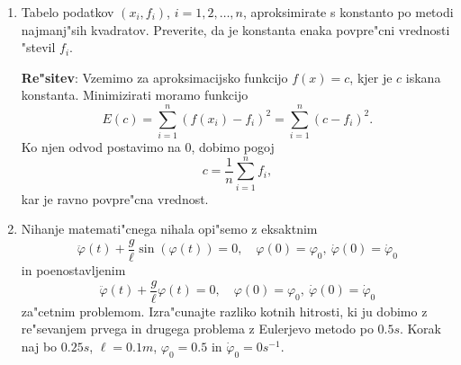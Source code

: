 \begin{enumerate}
    
    {\bf Re"sitev}: Konstanti $\alpha_1$ in $\alpha_2$ izra"cunamo tako, da
    za $f$ zaporedoma izberemo $1$ in $x$ ter zahtevamo, da je formula to"cna.
    Dobimo sistem
    \begin{align*}
    	\alpha_1+\alpha_2&=\arcsin{x}\vert_{-1}^1=\pi,\\
    	\alpha_1\frac{\sqrt{2}}{2}-\alpha_2\frac{\sqrt{2}}{2}&=0,
    \end{align*}
    katerega re"sitev je $\alpha_1=\alpha_2=\pi/2$.\\
    Numeri"cni pribli"zek za integral je torej
    $$\int_{-1}^{1}\frac{e^{x}}{\sqrt{1-x^2}}\,dx\approx
    \frac{\pi}{2}\left(e^{\frac{\sqrt{2}}{2}}+e^{-\frac{\sqrt{2}}{2}}\right)=
    3.9603.
    $$
    Iz Gauss--Chebysheve formule dobimo oceno za absolutno napako
    \begin{align*}
    	&\left|\int_{-1}^{1}\frac{e^{x}}{\sqrt{1-x^2}}\,dx-
        \sum_{k=1}^2 \alpha_k\,e^{\cos\left(\frac{2k-1}{4}\pi\right)}
       \right|\leq \frac{2\,\pi}{2^{4}(4)!}\max_{\xi\in[-1,1]}
       (e^{x})^{(4)}\\
       &<\frac{2\,\pi}{2^{4}(4)!}e^1=0.0445.
    \end{align*}
    
  \item Tabelo podatkov $(x_i,f_i)$, $i=1,2,\dots,n$, 
      aproksimirate s konstanto po metodi
      najmanj"sih kvadratov. Preverite, da je konstanta enaka povpre"cni vrednosti
      "stevil $f_i$.  
    
    {\bf Re"sitev}: Vzemimo za aproksimacijsko funkcijo $f(x)=c$, kjer
     je $c$ iskana konstanta.
     Minimizirati moramo funkcijo
     $$E(c)=\sum_{i=1}^n(f(x_i)-f_i)^2=
     \sum_{i=1}^n(c-f_i)^2.
     $$
     Ko njen odvod postavimo na $0$, dobimo pogoj
     $$c=\frac{1}{n}\sum_{i=1}^n f_i,$$ 
     kar je ravno povpre"cna vrednost.
    	
  
  \item 
    Nihanje matemati"cnega nihala opi"semo z eksaktnim  
    $$\ddot\varphi(t)+\frac{g}{\ell}\sin(\varphi(t))=0, \quad \varphi(0)=\varphi_0,\ 
      \dot\varphi(0)=\dot\varphi_0$$
    in poenostavljenim 
     $$\ddot\varphi(t)+\frac{g}{\ell}\varphi(t)=0, \quad \varphi(0)=\varphi_0,\ 
      \dot\varphi(0)=\dot\varphi_0$$
    za"cetnim problemom. 
    Izra"cunajte razliko kotnih hitrosti, ki ju dobimo z re"sevanjem prvega in drugega
    problema z Eulerjevo metodo po $0.5s$. Korak naj bo $0.25s$, $\ell=0.1m$,
    $\varphi_0=0.5$ in $\dot\varphi_0=0s^{-1}$.
    

\end{enumerate}
